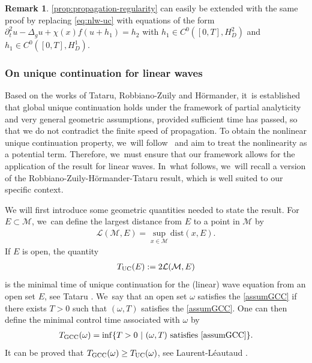 \documentclass[10pt]{amsart}
\theoremstyle{definition}
\newtheorem{remark}[theorem]{Remark}
\let\mc\mathcal
\newcommand{\M}{\mc{M}}
\begin{document}
\begin{remark}
\label{rk:propagsource}
\cref{prop:propagation-regularity} can easily be extended with the same proof by replacing \eqref{eq:nlw-uc} with equations of the form $\partial_t^2 u-\Delta_g u+\chi(x)f(u+h_1)=h_2$ with $h_1\in C^0([0,T],H^2_D)$ and $h_1\in C^0([0,T],H^1_D)$.
\end{remark}

\subsubsection{On unique continuation for linear waves}\label{s:UCPword} Based on the works of Tataru, Robbiano-Zuily and Hörmander, it~is established that global unique continuation holds under the framework of partial analyticity and very general geometric assumptions, provided sufficient time has passed, so that we do not contradict the finite speed of propagation. To obtain the nonlinear unique continuation property, we~will follow~\cite{JL13} and aim to treat the nonlinearity as a potential term. Therefore, we~must ensure that our framework allows for the application of the result for linear waves. In~what follows, we~will recall a version of the Robbiano-Zuily-Hörmander-Tataru result, which is well suited to our specific context.

We will first introduce some geometric quantities needed to state the result. For $E\subset \M$, we~can define the largest distance from $E$ to a point in $\M$ by\vspace*{-3pt}
\begin{align*}
\mc{L}(\M, E)=\sup_{x\in\M}\text{dist}(x, E).
\end{align*}
If $E$ is open, the quantity\vspace*{-3pt}
\begin{align*}
T_{\textup{UC}}(E):=2\mc{L}(\M, E)
\end{align*}
is the minimal time of unique continuation for the (linear) wave equation from an open set $E$, see Tataru \cite{Tat95}. We~say that an open set $\omega$ satisfies the \ref{assumGCC} if there exists $T>0$ such that $(\omega, T)$ satisfies the \ref{assumGCC}. One can then define the minimal control time associated with $\omega$ by\vspace*{-3pt}
\begin{align*}
T_{\textup{GCC}}(\omega)=\inf\{T>0\ |\ (\omega, T)\ \text{satisfies \ref{assumGCC}}\}.
\end{align*}
It can be proved that $T_{\textup{GCC}}(\omega)\geq T_{\textup{UC}}(\omega)$, see Laurent-Léautaud \cite[Lem.\,B.4]{LL16}.
\end{document}
